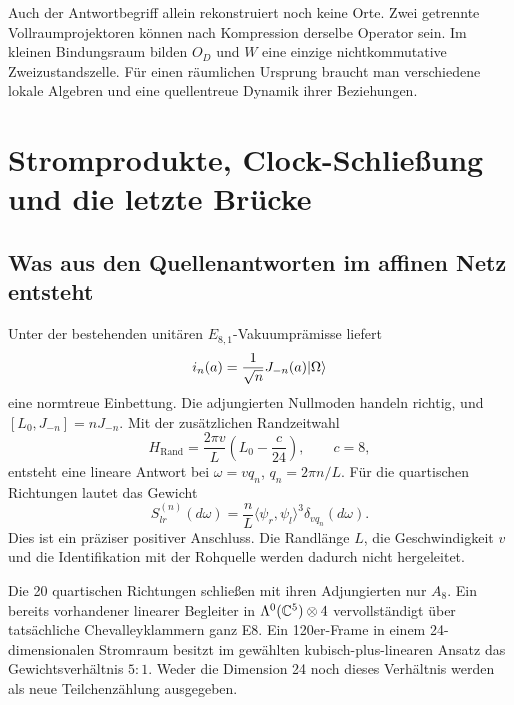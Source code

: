 Auch der Antwortbegriff allein rekonstruiert noch keine Orte. Zwei getrennte Vollraumprojektoren können nach Kompression derselbe Operator sein. Im kleinen Bindungsraum bilden $O_D$ und $W$ eine einzige nichtkommutative Zweizustandszelle. Für einen räumlichen Ursprung braucht man verschiedene lokale Algebren und eine quellentreue Dynamik ihrer Beziehungen. 

\chapter{Stromprodukte, Clock-Schließung und die letzte Brücke}
\section{Was aus den Quellenantworten im affinen Netz entsteht}
Unter der bestehenden unitären $E_{8,1}$-Vakuumprämisse liefert
\[
 i_n(a)=\frac1{\sqrt n}J_{-n}(a)\lvert \Omega\rangle
\]
eine normtreue Einbettung. Die adjungierten Nullmoden handeln richtig, und $[L_0,J_{-n}]=nJ_{-n}$. Mit der zusätzlichen Randzeitwahl
\[
 H_{\mathrm{Rand}}=\frac{2\pi v}{L}\left(L_0-\frac c{24}\right),
 \qquad c=8,
\]
entsteht eine lineare Antwort bei $\omega=vq_n$, $q_n=2\pi n/L$. Für die quartischen Richtungen lautet das Gewicht
\[
 S_{lr}^{(n)}(d\omega)=\frac nL
 \langle\psi_r,\psi_l\rangle^3\delta_{vq_n}(d\omega).
\]
Dies ist ein präziser positiver Anschluss. Die Randlänge $L$, die Geschwindigkeit $v$ und die Identifikation mit der Rohquelle werden dadurch nicht hergeleitet. 

Die 20 quartischen Richtungen schließen mit ihren Adjungierten nur $A_8$. Ein bereits vorhandener linearer Begleiter in $\Lambda^0(\mathbb C^5)\otimes4$ vervollständigt über tatsächliche Chevalleyklammern ganz E8. Ein 120er-Frame in einem 24-dimensionalen Stromraum besitzt im gewählten kubisch-plus-linearen Ansatz das Gewichtsverhältnis $5:1$. Weder die Dimension 24 noch dieses Verhältnis werden als neue Teilchenzählung ausgegeben. 

